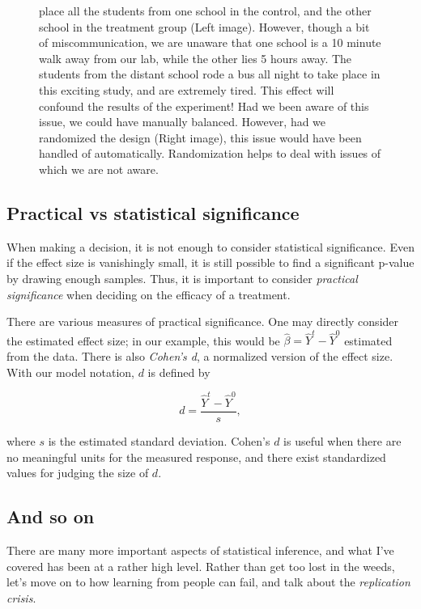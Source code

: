 \documentclass{tufte-handout}
\begin{document}
\begin{figure}[!ht]
{  place all the students from one school in the control, and the other
  school in the treatment group (Left image). However, though a bit of
  miscommunication, we are unaware that one school is a 10 minute walk away
  from our lab, while the other lies 5 hours away. The students from the
  distant school rode a bus all night to take place in this exciting
  study, and are extremely tired. This effect will confound the results
  of the experiment! Had we been aware of this issue, we could have manually
  balanced. However, had we randomized the design (Right image), this issue
  would have been handled of automatically. Randomization helps to
  deal with issues of which we are not aware.}
  \label{fig:randomize}
\end{figure}

\subsection{Practical vs statistical significance}
\label{sec:org5dab3a8}
When making a decision, it is not enough to consider statistical significance.
Even if the effect size is vanishingly small, it is still possible to find a
significant p-value by drawing enough samples. Thus, it is important to consider
\emph{practical significance} when deciding on the efficacy of a treatment.

There are various measures of practical significance. One may directly consider
the estimated effect size; in our example, this would be
\(\hat{\beta}=\hat{Y}^t-\hat{Y}^0\) estimated from the data. There is also
\emph{Cohen's d}, a normalized version of the effect size. With our model notation,
\(d\) is defined by

\begin{equation}\label{eq:cohen}
  d = \frac{\hat{Y}^t-\hat{Y}^0}{s},
\end{equation}

where \(s\) is the estimated standard deviation. Cohen's \(d\) is useful when there
are no meaningful units for the measured response, and there exist standardized
values for judging the size of \(d\).
\subsection{And so on}
\label{sec:org2def7ea}
There are many more important aspects of statistical inference, and what I've
covered has been at a rather high level. Rather than get too lost in the weeds,
let's move on to how learning from people can fail, and talk about the
\emph{replication crisis}.
\end{document}
